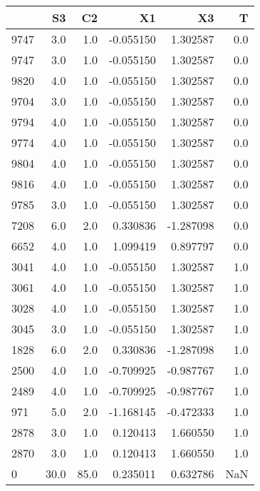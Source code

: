 \begin{tabular}{lrrrrr}
\toprule
{} &    S3 &    C2 &        X1 &        X3 &    T \\
\midrule
9747 &   3.0 &   1.0 & -0.055150 &  1.302587 &  0.0 \\
9747 &   3.0 &   1.0 & -0.055150 &  1.302587 &  0.0 \\
9820 &   4.0 &   1.0 & -0.055150 &  1.302587 &  0.0 \\
9704 &   3.0 &   1.0 & -0.055150 &  1.302587 &  0.0 \\
9794 &   4.0 &   1.0 & -0.055150 &  1.302587 &  0.0 \\
9774 &   4.0 &   1.0 & -0.055150 &  1.302587 &  0.0 \\
9804 &   4.0 &   1.0 & -0.055150 &  1.302587 &  0.0 \\
9816 &   4.0 &   1.0 & -0.055150 &  1.302587 &  0.0 \\
9785 &   3.0 &   1.0 & -0.055150 &  1.302587 &  0.0 \\
7208 &   6.0 &   2.0 &  0.330836 & -1.287098 &  0.0 \\
6652 &   4.0 &   1.0 &  1.099419 &  0.897797 &  0.0 \\
3041 &   4.0 &   1.0 & -0.055150 &  1.302587 &  1.0 \\
3061 &   4.0 &   1.0 & -0.055150 &  1.302587 &  1.0 \\
3028 &   4.0 &   1.0 & -0.055150 &  1.302587 &  1.0 \\
3045 &   3.0 &   1.0 & -0.055150 &  1.302587 &  1.0 \\
1828 &   6.0 &   2.0 &  0.330836 & -1.287098 &  1.0 \\
2500 &   4.0 &   1.0 & -0.709925 & -0.987767 &  1.0 \\
2489 &   4.0 &   1.0 & -0.709925 & -0.987767 &  1.0 \\
971  &   5.0 &   2.0 & -1.168145 & -0.472333 &  1.0 \\
2878 &   3.0 &   1.0 &  0.120413 &  1.660550 &  1.0 \\
2870 &   3.0 &   1.0 &  0.120413 &  1.660550 &  1.0 \\
0    &  30.0 &  85.0 &  0.235011 &  0.632786 &  NaN \\
\bottomrule
\end{tabular}
